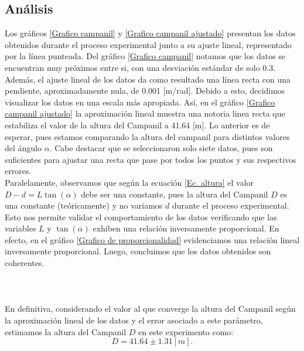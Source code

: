\documentclass[10pt,a4paper]{article}
\begin{document}
\begin{multicols}{2}
	\section{Análisis}
Los gráficos \ref{Grafico campanil} y \ref{Grafico campanil ajustado}  presentan los datos obtenidos durante el proceso experimental junto a su ajuste lineal, 		representado por la línea punteada. Del gráfico \ref{Grafico campanil} notamos que los datos se encuentran muy próximos entre si, 	con una desviación estándar de solo 0.3. Además, el ajuste lineal de los datos da como resultado una línea recta con una pendiente, aproximadamente nula, de 0.001 [m/rad]. Debido a esto, decidimos visualizar los datos en una escala más apropiada. Así, en el gráfico \ref{Grafico campanil ajustado} la aproximación lineal muestra una notoria linea recta que estabiliza el valor de la altura del Campanil a 41.64 [m]. Lo anterior es de esperar, pues estamos comparando la altura del campanil para distintos valores del ángulo $\alpha$. Cabe destacar que se seleccionaron solo siete datos, pues son suficientes para ajustar una recta que pase por todos los puntos y sus respectivos errores.\\

Paralelamente, observamos que según la ecuación \ref{Ec. altura} el valor $D - d = L \tan(\alpha)$ debe ser una constante, pues la altura del Campanil $D$ es una constante (teóricamente) y no variamos  $d$ durante el proceso experimental. Esto nos permite validar el comportamiento de los datos verificando que las variables $L$ y $\tan(\alpha)$ exhiben una relación inversamente proporcional. En efecto, en el gráfico \ref{Grafico de proporcionalidad} evidenciamos una relación lineal inversamente proporcional. Luego, concluimos que los datos obtenidos son coherentes.\\
\\
\\
\\
En definitiva, considerando el valor al que converge la altura del Campanil según la aproximación lineal de los datos y el error asociado a este parámetro, estimamos la altura del Campanil $D$ en este experimento como: $$D = 41.64 \pm 1.31 [m].$$
	

\end{multicols}
\end{document}
